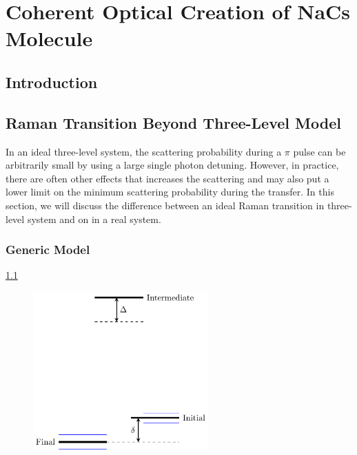 
\chapter{Coherent Optical Creation of NaCs Molecule}
\label{ch:raman-transfer}

\section{Introduction}

\section{Raman Transition Beyond Three-Level Model}

In an ideal three-level system, the scattering probability during a $\pi$ pulse
can be arbitrarily small by using a large single photon detuning.
However, in practice, there are often other effects that increases the scattering
and may also put a lower limit on the minimum scattering probability during the transfer.
In this section, we will discuss the difference between an ideal Raman transition
in three-level system and on in a real system.

\subsection{Generic Model}

\ref{fig:raman-transfer-generic-raman-model}

\begin{figure}
  \centering
  \includegraphics[width=0.6\textwidth]{figures/raman_transfer_generic_raman_model.pdf}
  \caption[Generic model for a real Raman transition]{
    \todo{}
    \label{fig:raman-transfer-generic-raman-model}}
\end{figure}

